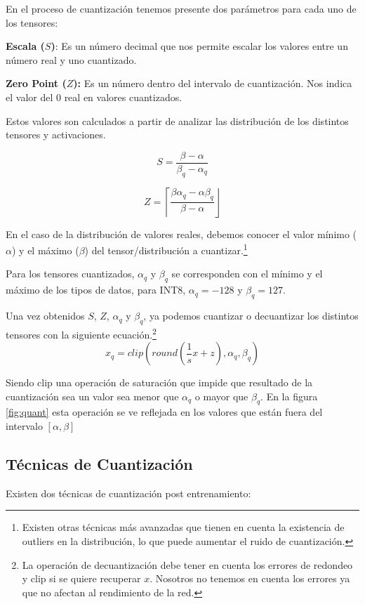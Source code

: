 En el proceso de cuantización tenemos presente dos parámetros para cada
uno de los tensores:

\textbf{Escala ($S$)}: Es un número decimal que nos permite escalar los
valores entre un número real y uno cuantizado.

\textbf{Zero Point ($Z$):} Es un número dentro del intervalo de cuantización.
Nos indica el valor del 0 real en valores cuantizados.

Estos valores son calculados a partir de analizar las distribución de los distintos tensores y activaciones.

\begin{equation}
    S = \frac{\beta - \alpha}{\beta_q - \alpha_q}    
\end{equation}

\begin{equation}
    Z = \left\lceil\frac{\beta\alpha_q - \alpha\beta_q}{\beta-\alpha}\right\rfloor
\end{equation}



En el caso de la distribución de valores reales, debemos conocer el valor mínimo
($\alpha$) y el máximo ($\beta$) del tensor/distribución a cuantizar.\footnote{Existen otras técnicas más avanzadas que tienen en cuenta la existencia de outliers en la distribución, lo que puede aumentar el ruido de cuantización.} 

Para los tensores cuantizados, $\alpha_q$ y $\beta_q$ se corresponden con el mínimo y el máximo de
los tipos de datos, para INT8,  $\alpha_q = -128$ y $\beta_q = 127$.

Una vez obtenidos $S$, $Z$, $\alpha_q$ y $\beta_q$, ya podemos cuantizar o decuantizar los distintos tensores con la siguiente ecuación.\footnote{La operación de decuantización debe tener en cuenta los errores de redondeo y clip si se quiere recuperar $x$. Nosotros no tenemos en cuenta los errores ya que no afectan al rendimiento de la red.}
\begin{equation}
    x_q = clip(round(\frac{1}{s}x + z), \alpha_q, \beta_q)
\end{equation}


Siendo clip una operación de saturación que impide que resultado de la cuantización sea un valor sea menor que $\alpha_q$ o mayor que $\beta_q$.
En la figura \ref{fig:quant} esta operación se ve reflejada en los valores que están fuera del intervalo $[\alpha,\beta]$


\hypertarget{tecnicas-de-cuantizacion}{%
\subsection{\texorpdfstring{Técnicas de Cuantización
}{Técnicas de Cuantización }}\label{tecnicas-de-cuantizacion}}
Existen dos técnicas de cuantización post entrenamiento:
